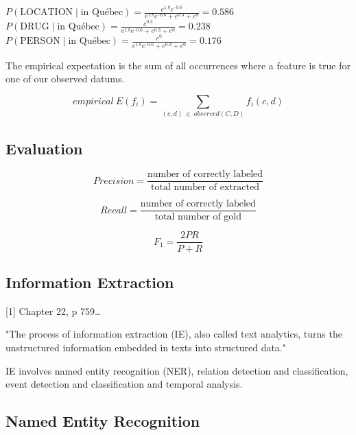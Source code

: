 $P(\text{LOCATION} \mid \text{in Québec}) = \frac{e^{1.8} e^{–0.6}}{e^{1.8} e^{–0.6} + e^{0.3} + e^0} = 0.586$\\
$P(\text{DRUG} \mid \text{in Québec}) = \frac{e^{0.3}}{e^{1.8} e^{–0.6} + e^{0.3} + e^0} = 0.238$\\
$P(\text{PERSON} \mid \text{in Québec}) = \frac{e^0}{e^{1.8} e^{–0.6} + e^{0.3} + e^0} = 0.176$

The empirical expectation is the sum of all occurrences where a feature is true for one of our observed datums.

\begin{equation}
  empirical \ E(f_i)= \sum_{(c,d) \ \in \ observed(C,D)}f_i(c,d)
  \label{eq:epirical}
\end{equation}

\subsection*{Evaluation}

\begin{equation}
  Precision = \frac{\text{number of correctly labeled}}{\text{total number of extracted}}
  \label{eq:preci}
\end{equation}

\begin{equation}
  Recall = \frac{\text{number of correctly labeled}}{\text{total number of gold}}
  \label{eq:reca}
\end{equation}

\begin{equation}
  F_1 = \frac{2PR}{P+R}
  \label{eq:f1mes}
\end{equation}

\subsection*{Information Extraction}

[1] Chapter 22, p 759…

"The process of information extraction (IE), also called text analytics, turns the unstructured information embedded in texts into structured data."

IE involves named entity recognition (NER), relation detection and classification, event detection and classification and temporal analysis.

\subsection*{Named Entity Recognition}

